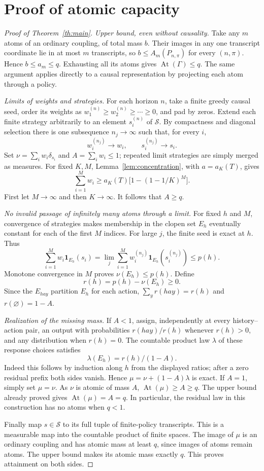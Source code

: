 \documentclass[11pt]{article}
\newcommand{\At}{\operatorname{At}}
\newcommand{\cS}{\mathcal S}
\begin{document}
\section{Proof of atomic capacity}
\begin{proof}[Proof of Theorem~\ref{th:main}]
\emph{Upper bound, even without causality.}
Take any $m$ atoms of an ordinary coupling, of total mass $b$. Their
images in any one transcript coordinate lie in at most $m$ transcripts,
so $b\le A_m(P_{n,\pi})$ for every $(n,\pi)$. Hence $b\le a_m\le q$.
Exhausting all its atoms gives $\At(\Gamma)\le q$. The same argument
applies directly to a causal representation by projecting each atom
through a policy.

\emph{Limits of weights and strategies.}
For each horizon $n$, take a finite greedy causal seed, order its weights
as $w^{(n)}_1\ge w^{(n)}_2\ge\cdots\ge0$, and pad by zeros.
Extend each finite strategy arbitrarily to an element $s^{(n)}_i$ of
$\cS$. By compactness and diagonal selection there is one subsequence
$n_j\to\infty$ such that, for every $i$,
\[
 w_i^{(n_j)}\to w_i,\qquad s_i^{(n_j)}\to s_i.
\]
Set $\nu=\sum_iw_i\delta_{s_i}$ and $A=\sum_iw_i\le1$; repeated
limit strategies are simply merged as measures. For fixed $K,M$,
Lemma~\ref{lem:concentration}, with $a=a_K(T)$, gives
\[
 \sum_{i=1}^M w_i
 \ge a_K(T)\bigl[1-(1-1/K)^M\bigr].
\]
First let $M\to\infty$ and then $K\to\infty$. It follows that
$A\ge q$.

\emph{No invalid passage of infinitely many atoms through a limit.}
For fixed $h$ and $M$, convergence of strategies makes membership in
the clopen set $E_h$ eventually constant for each of the first $M$
indices. For large $j$, the finite seed is exact at $h$. Thus
\[
 \sum_{i=1}^M w_i\mathbf1_{E_h}(s_i)
 =\lim_j\sum_{i=1}^M w_i^{(n_j)}\mathbf1_{E_h}(s_i^{(n_j)})
 \le p(h).
\]
Monotone convergence in $M$ proves $\nu(E_h)\le p(h)$. Define
\[
 r(h)=p(h)-\nu(E_h)\ge0.
\]
Since the $E_{hay}$ partition $E_h$ for each action,
$\sum_y r(hay)=r(h)$ and $r(\varnothing)=1-A$.

\emph{Realization of the missing mass.}
If $A<1$, assign, independently at every history--action pair, an output
with probabilities $r(hay)/r(h)$ whenever $r(h)>0$, and any distribution
when $r(h)=0$. The countable product law $\lambda$ of these response
choices satisfies
\[
 \lambda(E_h)=r(h)/(1-A).
\]
Indeed this follows by induction along $h$ from the displayed ratios;
after a zero residual prefix both sides vanish. Hence
$\mu=\nu+(1-A)\lambda$ is exact. If $A=1$, simply set $\mu=\nu$.
As $\nu$ is atomic of mass $A$, $\At(\mu)\ge A\ge q$.
The upper bound already proved gives $\At(\mu)=A=q$. In particular,
the residual law in this construction has no atoms when $q<1$.

Finally map $s\in\cS$ to its full tuple of finite-policy transcripts.
This is a measurable map into the countable product of finite spaces.
The image of $\mu$ is an ordinary coupling and has atomic mass at least
$q$, since images of atoms remain atoms. The upper bound makes its
atomic mass exactly $q$. This proves attainment on both sides.
\end{proof}
\end{document}
